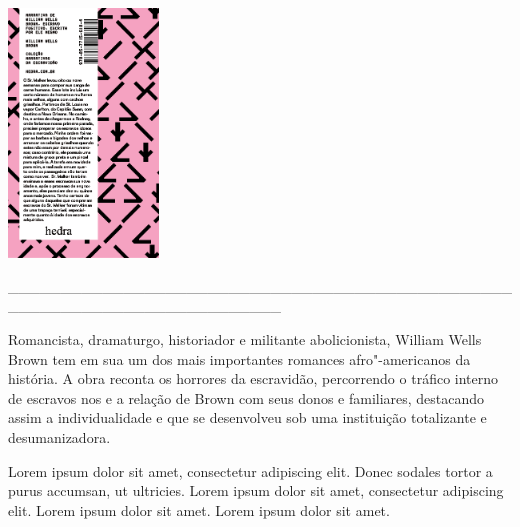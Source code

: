 \pagebreak

\hspace{.5cm}

\begin{center}
\hspace*{-3cm}
\hspace{2cm}\includegraphics[width=40mm]{./imgs/wwb.png}
\end{center}

\hspace*{-2cm}\_\_\_\_\_\_\_\_\_\_\_\_\_\_\_\_\_\_\_\_\_\_\_\_\_\_\_\_\_\_\_\_\_\_\_\_\_\_\_\_\_\_\_\_\_\_\_\_\_\_\_\_\_\_\_\_\_\_\_\_\_\_\_\_\_\_\_\_\_\_\_\_\_\_

\medskip

\noindent{}Romancista, dramaturgo, historiador e militante abolicionista, William Wells Brown tem em sua {} um dos mais importantes romances afro"-americanos da história. A obra reconta os horrores da escravidão, percorrendo o tráfico interno de escravos nos  e a relação de Brown com seus donos e familiares, destacando assim a individualidade e que se desenvolveu sob uma instituição totalizante e desumanizadora.

\hspace{.5cm}

\hspace*{-.4cm}\begin{minipage}[c]{0.45\linewidth}
\footnotesize{
{}}
\end{minipage}
\begin{minipage}[c]{0.50\linewidth}
\small{Lorem ipsum dolor sit amet, consectetur adipiscing elit.
Donec sodales tortor a purus accumsan, ut ultricies. Lorem ipsum dolor sit amet, consectetur adipiscing elit. Lorem ipsum dolor sit amet. Lorem ipsum dolor sit amet.} 
\end{minipage}

